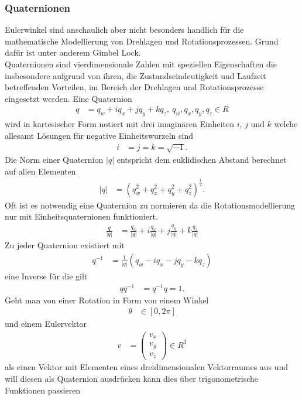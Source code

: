 \subsubsection{Quaternionen}
Eulerwinkel sind anschaulich aber nicht besonders handlich für die mathematische Modellierung von Drehlagen und Rotationsprozessen. Grund dafür ist unter anderem Gimbel Lock.\\
Quaternionen sind vierdimensionale Zahlen mit speziellen Eigenschaften die insbesondere aufgrund von ihren, die Zustandseindeutigkeit und Laufzeit betreffenden Vorteilen, im Bereich der Drehlagen und Rotationsprozesse eingesetzt werden. Eine Quaternion
\begin{align}
	q &= q_w + iq_x + jq_y + kq_z,\ q_w, q_x, q_y, q_z \in R
\end{align}
wird in kartesischer Form notiert mit drei imaginären Einheiten $i$, $j$ und $k$ welche allesamt Lösungen für negative Einheitswurzeln sind
\begin{align}
	i &= j = k = \sqrt{-1}.
\end{align}
Die Norm einer Quaternion $|q|$ entspricht dem euklidischen Abstand berechnet auf allen Elementen
\begin{align*}
	|q| &= \left (q_w^2 + q_x^2 + q_y ^ 2 + q_z ^ 2\right )^{\frac{1}{2}}.
\end{align*}
Oft ist es notwendig eine Quaternion zu normieren da die Rotationsmodellierung nur mit Einheitsquaternionen funktioniert.
\begin{align}
	\frac{q}{|q|} &= \frac{q_w}{|q|} + i\frac{q_x}{|q|} + j\frac{q_y}{|q|} + k\frac{q_z}{|q|}
\end{align}
Zu jeder Quaternion existiert mit
\begin{align}
	q^{-1} &= \frac{1}{|q|}(q_w - iq_x - jq_y - kq_z)
\end{align}
eine Inverse für die gilt
\begin{align}
	qq^{-1} &= q^{-1}q = 1.
\end{align}
Geht man von einer Rotation in Form von einem Winkel
\begin{align}
	\theta &\in [0, 2\pi]
\end{align}
und einem Eulervektor
\begin{align}
	v &= \begin{pmatrix}
		v_x\\
		v_y\\
		v_z
	\end{pmatrix}
	\in R^3
\end{align} 
als einen Vektor mit Elementen eines dreidimensionalen Vektorraumes aus und will diesen als Quaternion ausdrücken kann dies über trigonometrische Funktionen passieren
